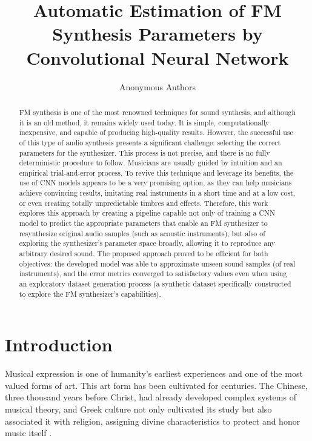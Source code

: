 \documentclass[10pt,conference]{IEEEtran}
\title{\LARGE \bf
Automatic Estimation of FM Synthesis Parameters by Convolutional Neural Network
}
\begin{document}
\author{Anonymous Authors}

\maketitle
\thispagestyle{empty}
\pagestyle{empty}


\begin{abstract}
FM synthesis is one of the most renowned techniques for sound synthesis, and although it is an old method, it remains widely used today. It is simple, computationally inexpensive, and capable of producing high-quality results. However, the successful use of this type of audio synthesis presents a significant challenge: selecting the correct parameters for the synthesizer. This process is not precise, and there is no fully deterministic procedure to follow. Musicians are usually guided by intuition and an empirical trial-and-error process. To revive this technique and leverage its benefits, the use of CNN models appears to be a very promising option, as they can help musicians achieve convincing results, imitating real instruments in a short time and at a low cost, or even creating totally unpredictable timbres and effects. Therefore, this work explores this approach by creating a pipeline capable not only of training a CNN model to predict the appropriate parameters that enable an FM synthesizer to resynthesize original audio samples (such as acoustic instruments), but also of exploring the synthesizer’s parameter space broadly, allowing it to reproduce any arbitrary desired sound. The proposed approach proved to be efficient for both objectives: the developed model was able to approximate unseen sound samples (of real instruments), and the error metrics converged to satisfactory values even when using an exploratory dataset generation process (a synthetic dataset specifically constructed to explore the FM synthesizer’s capabilities).
\end{abstract}


\section{Introduction}

Musical expression is one of humanity’s earliest experiences and one of the most valued forms of art. This art form has been cultivated for centuries. The Chinese, three thousand years before Christ, had already developed complex systems of musical theory, and Greek culture not only cultivated its study but also associated it with religion, assigning divine characteristics to protect and honor music itself \cite{med1996teoria}.
\end{document}
